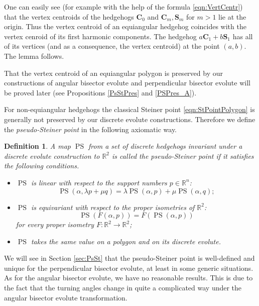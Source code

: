\documentclass[12pt]{article}
\makeatletter
\newtheorem{definition}[lemma]{Definition}
\renewenvironment{proof}[1][\proofname] 
{\par\pushQED{\qed}\normalfont\topsep6\p@\@plus6\p@\relax\trivlist\item[\hskip\labelsep\bfseries#1\@addpunct{.}]\ignorespaces}{\popQED\endtrivlist\@endpefalse}
\newcommand{\R}{\mathbb {R}}
\newcommand{\PS}{\operatorname{PS}}
\makeatother
\begin{document}
\begin{proof}
One can easily see (for example with the help of the formula \eqref{eqn:VertCentr}) that the vertex centroids of the hedgehogs $\mathbf{C}_0$ and $\mathbf{C}_m, \mathbf{S}_m$ for $m > 1$ lie at the origin. Thus the vertex centroid of an equiangular hedgehog coincides with the vertex cenroid of its first harmonic components. The hedgehog $a\mathbf{C}_1 + b\mathbf{S}_1$ has all of its vertices (and as a consequence, the vertex centroid) at the point $(a,b)$. The lemma follows.
\end{proof}

That the vertex centroid of an equiangular polygon is preserved by our constructions of angular bisector evolute and perpendicular bisector evolute will be proved later (see Propositions \ref{PsStPres} and \ref{PSPres_A}).


For non-equiangular hedgehogs the classical Steiner point \eqref{eqn:StPointPolygon} is generally not preserved by our discrete evolute constructions. Therefore we define the {\it pseudo-Steiner point} in the following axiomatic way.


\begin{definition}
\label{dfn:PsSt}
A map $\PS$ from a set of discrete hedgehogs invariant under a discrete evolute construction to 
$\R^2$  is called the \emph{pseudo-Steiner point} if it satisfies the following conditions.
\begin{itemize}
\item $\PS$ is linear with respect to the support numbers $p \in \R^n$:
\[ \PS(\alpha, \lambda p + \mu q) = \lambda \PS(\alpha, p) + \mu \PS(\alpha, q); \]
\item $\PS$ is equivariant with respect to the proper isometries of $\R^2$:
\[ \PS(F(\alpha,p)) = F(\PS(\alpha,p)) \]
for every proper isometry $F \colon \R^2 \to \R^2$;
\item $\PS$ takes the same value on a polygon and on its discrete evolute.
\end{itemize}
\end{definition}

We will see in Section \ref{sec:PsSt} that the pseudo-Steiner point is well-defined and unique for the perpendicular bisector evolute, at least in some generic situations. As for the angular bisector evolute, we have no reasonable results. This is due to the fact that the turning angles change in quite a complicated way under the angular bisector evolute transformation.
\end{document}

